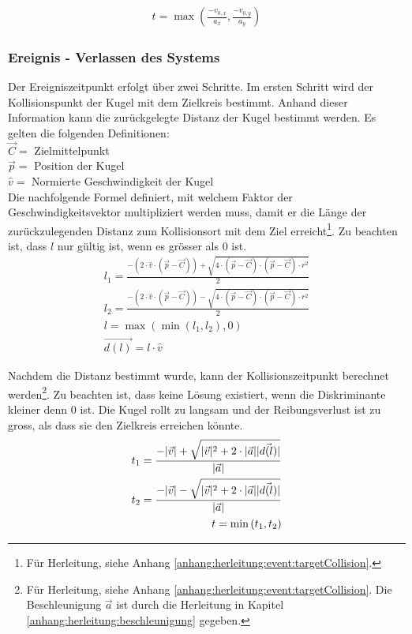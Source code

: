 \begin{align}
    t = \max{(\frac{-v_{0,x}}{a_x}, \frac{-v_{0,y}}{a_y})}\label{eq:ereignis:out_of_energy:00}
\end{align}

\subsubsection{Ereignis - Verlassen des Systems}
Der Ereigniszeitpunkt erfolgt über zwei Schritte. Im ersten Schritt wird der Kollisionspunkt der Kugel mit dem
Zielkreis bestimmt. Anhand dieser Information kann die zurückgelegte Distanz der Kugel bestimmt werden.
Es gelten die folgenden Definitionen:\\
$\vec{C} = $ Zielmittelpunkt\\
$\vec{p} = $ Position der Kugel\\
$\hat{v} = $ Normierte Geschwindigkeit der Kugel\\

Die nachfolgende Formel definiert, mit welchem Faktor der Geschwindigkeitsvektor multipliziert werden muss, damit
er die Länge der zurückzulegenden Distanz zum Kollisionsort mit dem Ziel erreicht\footnote{
Für Herleitung, siehe Anhang \ref{anhang:herleitung:event:targetCollision}.}. Zu beachten ist, dass $l$ nur gültig ist,
wenn es grösser als $0$ ist.
\begin{align}
    l_1 = \frac{-(2 \cdot \hat{v} \cdot (\vec{p} - \vec{C})) + \sqrt{4 \cdot (\vec{p} - \vec{C}) \cdot (\vec{p} - \vec{C}) \cdot r^2}}{2}\\
    l_2 = \frac{-(2 \cdot \hat{v} \cdot (\vec{p} - \vec{C})) - \sqrt{4 \cdot (\vec{p} - \vec{C}) \cdot (\vec{p} - \vec{C}) \cdot r^2}}{2}\\
    l = \max{(\min{(l_1, l_2)}, 0)}\\
    \vec{d(l)} = l \cdot \hat{v}
\end{align}

Nachdem die Distanz bestimmt wurde, kann der Kollisionszeitpunkt berechnet werden\footnote{Für Herleitung, siehe Anhang \ref{anhang:herleitung:event:targetCollision}.
Die Beschleunigung $\vec{a}$ ist durch die Herleitung in Kapitel \ref{anhang:herleitung:beschleunigung} gegeben.}.
Zu beachten ist, dass keine Lösung existiert, wenn die Diskriminante kleiner denn $0$ ist. Die Kugel rollt zu langsam und
der Reibungsverlust ist zu gross, als dass sie den Zielkreis erreichen könnte.
\begin{align}
    t_1 = \frac{-\lvert \vec{v} \rvert + \sqrt{\lvert \vec{v} \rvert^2 + 2 \cdot \lvert \vec{a} \rvert \lvert \vec{d(l)} \rvert}}{\lvert \vec{a} \rvert}\\
    t_2 = \frac{-\lvert \vec{v} \rvert - \sqrt{\lvert \vec{v} \rvert^2 + 2 \cdot \lvert \vec{a} \rvert \lvert \vec{d(l)} \rvert}}{\lvert \vec{a} \rvert}\\
    t = \min{(t_1, t_2)}
\end{align}